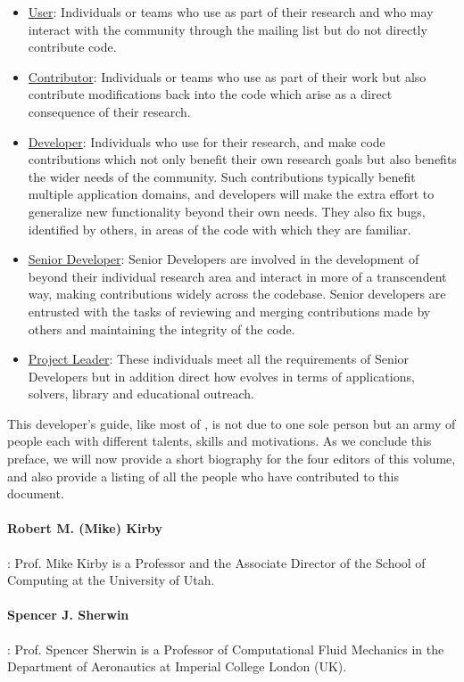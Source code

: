 \begin{itemize}
\item \underline{User}: Individuals or teams who use \nek{} as part of their research and who may interact with the community through the mailing list but do not directly contribute code.
%
\item \underline{Contributor}: Individuals or teams who use \nek{} as part of their work but also contribute modifications back into the code which arise as a direct consequence of their research.
%
\item \underline{Developer}: Individuals who use\nek{} for their research, and make code contributions which not only benefit their own research goals but also benefits the wider needs of the \nek{} community. Such contributions typically benefit multiple application domains, and developers will make the extra effort to generalize new functionality beyond their own needs. They also fix bugs, identified by others, in areas of the code with which they are familiar.
%
\item \underline{Senior Developer}: Senior Developers are involved in the development of \nek{} beyond their individual research area and interact in more of a transcendent way, making contributions widely across the codebase.  Senior developers are entrusted with the tasks of reviewing and merging contributions made by others and maintaining the integrity of the code.
%
\item \underline{Project Leader}: These individuals meet all the requirements of Senior Developers but in addition direct how \nek{} evolves in terms of applications, solvers, library and educational outreach.
\end{itemize}

This developer's guide, like most of \nek{}, is not due to one sole person but an army of people each with different talents, skills and motivations.  As we conclude this preface, we will now provide a short biography for the four editors of this volume, and also provide a listing of all the people who have contributed to this document.

\paragraph{Robert M. (Mike) Kirby}: Prof. Mike Kirby is a Professor and the Associate Director of the School of Computing at the University of Utah.

\paragraph{Spencer J. Sherwin}: Prof. Spencer Sherwin is a Professor of Computational Fluid Mechanics in the Department of Aeronautics at Imperial
College London (UK).

